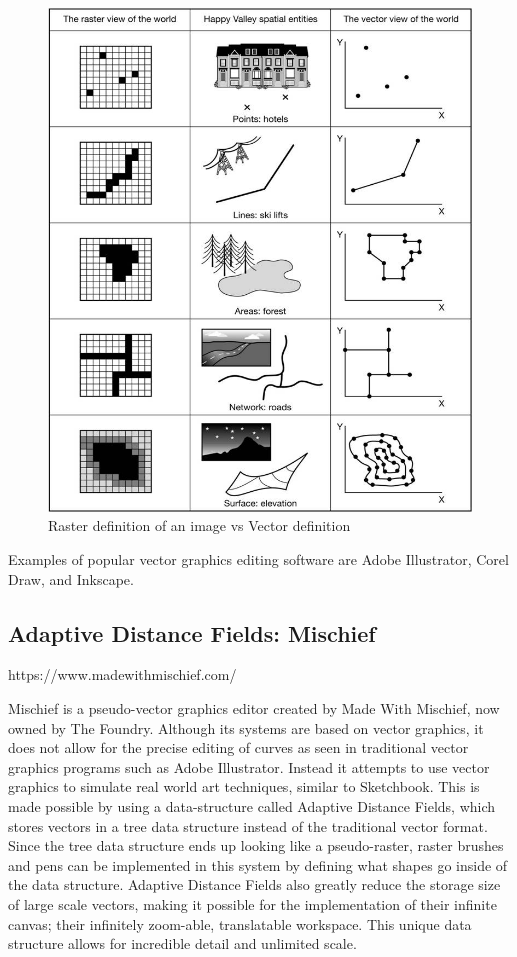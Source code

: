 \documentclass[12pt]{report}
\begin{document}
\begin{figure}
\includegraphics[width=\textwidth]{vector_raster.jpg}
\caption{Raster definition of an image vs Vector definition}
\end{figure}

Examples of popular vector graphics editing software are Adobe Illustrator, Corel Draw, and Inkscape.

\subsection{Adaptive Distance Fields: Mischief} https://www.madewithmischief.com/

Mischief is a pseudo-vector graphics editor created by Made With Mischief, now owned by The Foundry. 
Although its systems are based on vector graphics, it does not allow for the precise editing of curves as seen in traditional vector graphics programs such as Adobe Illustrator. 
Instead it attempts to use vector graphics to simulate real world art techniques, similar to Sketchbook.
This is made possible by using a data-structure called Adaptive Distance Fields, which stores vectors in a tree data structure instead of the traditional vector format.
Since the tree data structure ends up looking like a pseudo-raster, raster brushes and pens can be implemented in this system by defining what shapes go inside of the data structure.
Adaptive Distance Fields also greatly reduce the storage size of large scale vectors, making it possible for the implementation of their infinite canvas; their infinitely zoom-able, translatable workspace. 
This unique data structure allows for incredible detail and unlimited scale.
\end{document}
